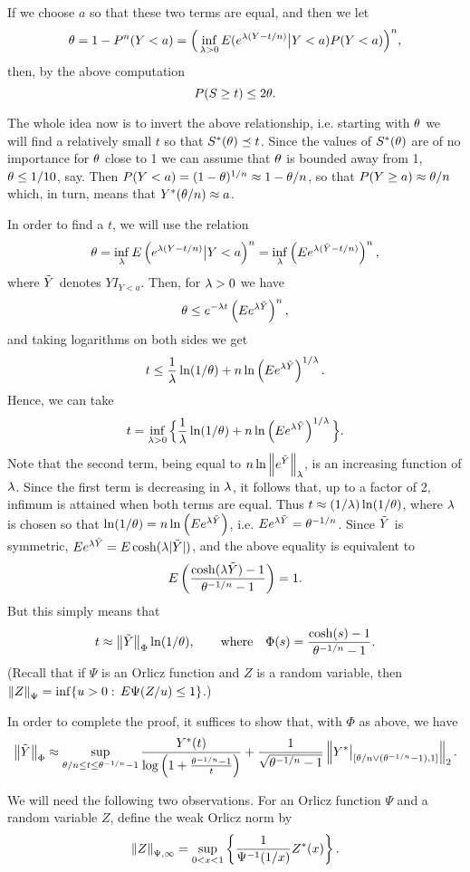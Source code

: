 If we choose $a$ so that these two terms are equal, and then we let
$$\theta=1-P^n(Y<a)=\Big(\inf_{\lambda >0}E(e^{\lambda(Y-t/n)}\big|Y<a)P(Y<a)\Big)^n,
$$
then, by the above computation
$$
P(S\ge t)\le 2\theta.
$$

The whole idea now is to invert the above relationship, i.e. starting with
$\theta$ we will find
a relatively small $t$ so that $S^*(\theta)\preceq t$. Since the values of
$S^*(\theta)$ are of no importance for $\theta$ close to 1 we can assume that
$\theta$ is bounded away from 1, $\theta\le 1/10$, say. Then
$P(Y<a)=(1-\theta)^{1/n}
\approx 1-\theta/n$, so that $P(Y\ge a)\approx\theta/n$ which, in
turn, means that $Y^*(\theta/n)\approx a$.

In order to find a $t$, we will use the relation
$$\theta=\inf_{\lambda}E\left(e^{\lambda(Y-t/n)}\big|Y<a\right)^n=
\inf_{\lambda}\left(Ee^{\lambda(\tilde Y-t/n)}\right)^n,$$ where $\tilde Y$ denotes
$YI_{Y<a}$. Then, for $\lambda>0$ we have $$\theta\le e^{-\lambda t}\left(Ee^{\lambda
\tilde Y}\right)^n,$$ and taking logarithms on both sides we get
$$t\le{1\over\lambda}\ln(1/\theta)+n\ln\left(Ee^{\lambda \tilde Y}\right)^{1/\lambda}.$$ Hence,
we can take
$$t=\inf_{\lambda>0}\Big\{{1\over\lambda}\ln(1/\theta)+n\ln\left(Ee^{\lambda \tilde Y}\right)^
{1/\lambda}\Big\}.$$
Note that the second term, being equal to $n\ln\left\|e^{\tilde Y}\right\|_{\lambda}$, is
an increasing function of $\lambda$.
Since the first term is decreasing in $\lambda$, it follows that, up to a
factor of 2,
infimum is attained when both terms are equal. Thus
$t\approx(1/\lambda)\ln(1/\theta)$, where $\lambda$ is chosen so that
$\ln(1/\theta)=n\ln\left(Ee^{\lambda \tilde Y}\right)$, i.e. $Ee^{\lambda \tilde Y}=\theta^{-1/n}$.
Since $\tilde Y$ is symmetric, $Ee^{\lambda \tilde Y} =E\cosh(\lambda|\tilde Y|)$, and the above
equality is equivalent to
$$E\left({\cosh(\lambda \tilde Y)-1\over \theta^{-1/n}-1}\right)=1.$$ But this simply
means that
$$t\approx \left\|\tilde Y\right\|_{\Phi}\ln(1/\theta),\qquad {\rm where }\quad
\Phi(s)={\cosh(s)-1\over\theta^{-1/n}-1}.
$$
(Recall that if $\Psi$ is an Orlicz function and $Z$ is a random variable,
then $\left\|Z\right\|_{\Psi}=\inf\{u>0:\, E\Psi(Z/u)\le 1\}$.)

In order to complete the proof, it suffices to show that, with $\Phi$ as
above, we have $$\left\|\tilde Y\right\|_{\Phi}\approx\sup_{\theta/n\le t\le
\theta^{-1/n}-1}{Y^*(t)\over\log \left(1+{\theta^{-1/n}-1\over t}\right)}+{1\over
\sqrt{\theta^{-1/n}-1}}\left\|Y^*\big|_{[\theta/n\vee(\theta^{-1/n}-1),1]}\right\|_2. $$

We will need the following two observations. For an Orlicz function $\Psi$
and a random variable $Z$, define
the weak Orlicz norm by
$$\left\|Z\right\|_{\Psi,\infty}=\sup_{0<x<1}\left\{{1\over\Psi^{-1}(1/x)}
Z^*(x)\right\}.$$

